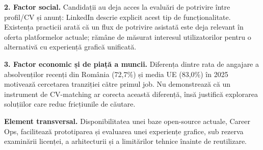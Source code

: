 \documentclass[12pt,a4paper]{article}
\begin{document}
\textbf{2. Factor social.} Candidații au deja acces la evaluări de potrivire între profil/CV și anunț: LinkedIn descrie explicit acest tip de funcționalitate. Existența practicii arată că un flux de potrivire asistată este deja relevant în oferta platformelor actuale; rămâne de măsurat interesul utilizatorilor pentru o alternativă cu experiență grafică unificată.

\textbf{3. Factor economic și de piață a muncii.} Diferența dintre rata de angajare a absolvenților recenți din România (72,7\%) și media UE (83,0\%) în 2025 motivează cercetarea tranziției către primul job. Nu demonstrează că un instrument de CV-matching ar corecta această diferență, însă justifică explorarea soluțiilor care reduc fricțiunile de căutare.

\textbf{Element transversal.} Disponibilitatea unei baze open-source actuale, Career Ops, facilitează prototiparea și evaluarea unei experiențe grafice, sub rezerva examinării licenței, a arhitecturii și a limitărilor tehnice înainte de reutilizare.

\end{document}
